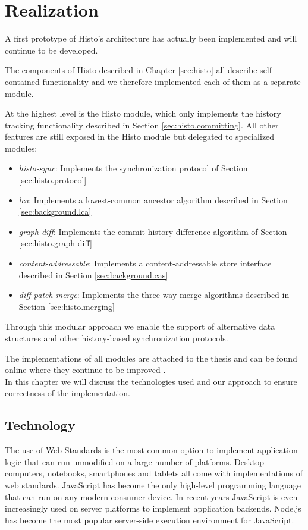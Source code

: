
\chapter{Realization}
\label{sec:realization}
A first prototype of Histo's architecture has actually been implemented and will continue to be developed.

The components of Histo described in Chapter \ref{sec:histo} all describe self-contained functionality and we therefore implemented each of them as a separate module.

At the highest level is the Histo module, which only implements the history tracking functionality described in Section \ref{sec:histo.committing}.
All other features are still exposed in the Histo module but delegated to specialized modules:

\begin{itemize}
\item \emph{histo-sync}: Implements the synchronization protocol of Section \ref{sec:histo.protocol}
\item \emph{lca}: Implements a lowest-common ancestor algorithm described in Section \ref{sec:background.lca}
\item \emph{graph-diff}: Implements the commit history difference algorithm of Section \ref{sec:histo.graph-diff}
\item \emph{content-addressable}: Implements a content-addressable store interface described in Section \ref{sec:background.cas}
\item \emph{diff-patch-merge}: Implements the three-way-merge algorithms described in Section \ref{sec:histo.merging}
\end{itemize}

Through this modular approach we enable the support of alternative data structures and other history-based synchronization protocols.

The implementations of all modules are attached to the thesis and can be found online where they continue to be improved \cite{histo-source}.\\

In this chapter we will discuss the technologies used and our approach to ensure correctness of the implementation.

\section{Technology}
\label{sec:realization.technology}
The use of Web Standards is the most common option to implement application logic that can run unmodified on a large number of platforms.
Desktop computers, notebooks, smartphones and tablets all come with implementations of web standards.
JavaScript has become the only high-level programming language that can run on any modern consumer device.
In recent years JavaScript is even increasingly used on server platforms to implement application backends.
Node.js has become the most popular server-side execution environment for JavaScript.\\

